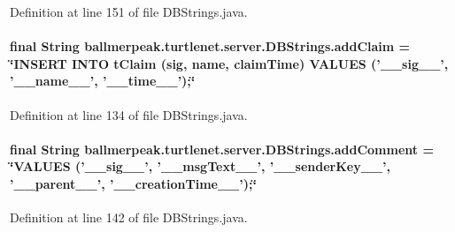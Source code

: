 Definition at line 151 of file D\-B\-Strings.\-java.

\hypertarget{classballmerpeak_1_1turtlenet_1_1server_1_1DBStrings_a7622f836df4c75f736ae6b35eaa936a9}{
\paragraph[{add\-Claim}]{\setlength{\rightskip}{0pt plus 5cm}final String ballmerpeak.\-turtlenet.\-server.\-D\-B\-Strings.\-add\-Claim = \char`\"{}I\-N\-S\-E\-R\-T I\-N\-T\-O t\-Claim (sig, name, claim\-Time) V\-A\-L\-U\-E\-S ('\-\_\-\-\_\-sig\-\_\-\-\_\-', '\-\_\-\-\_\-name\-\_\-\-\_\-', '\-\_\-\-\_\-time\-\_\-\-\_\-');\char`\"{}\hspace{0.3cm}{\ttfamily [static]}}}\label{classballmerpeak_1_1turtlenet_1_1server_1_1DBStrings_a7622f836df4c75f736ae6b35eaa936a9}


Definition at line 134 of file D\-B\-Strings.\-java.

\hypertarget{classballmerpeak_1_1turtlenet_1_1server_1_1DBStrings_a87d52ca49fb4861212ad5e9319ca8707}{
\paragraph[{add\-Comment}]{\setlength{\rightskip}{0pt plus 5cm}final String ballmerpeak.\-turtlenet.\-server.\-D\-B\-Strings.\-add\-Comment = \char`\"{}V\-A\-L\-U\-E\-S ('\-\_\-\-\_\-sig\-\_\-\-\_\-', '\-\_\-\-\_\-msg\-Text\-\_\-\-\_\-', '\-\_\-\-\_\-sender\-Key\-\_\-\-\_\-', '\-\_\-\-\_\-parent\-\_\-\-\_\-', '\-\_\-\-\_\-creation\-Time\-\_\-\-\_\-');\char`\"{}\hspace{0.3cm}{\ttfamily [static]}}}\label{classballmerpeak_1_1turtlenet_1_1server_1_1DBStrings_a87d52ca49fb4861212ad5e9319ca8707}


Definition at line 142 of file D\-B\-Strings.\-java.

